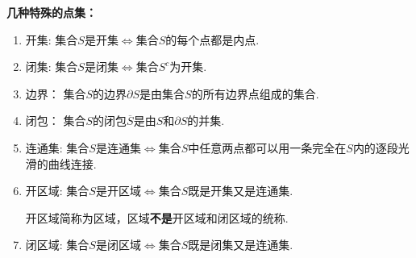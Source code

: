 \documentclass[openany,oneside]{ctexbook}
\begin{document}
\noindent\textbf{几种特殊的点集：}
\begin{enumerate}[label=(\arabic*), itemsep=1pt]
   \item 开集: 集合$S$是开集$\iff$集合$S$的每个点都是内点.
   \item 闭集: 集合$S$是闭集$\iff$集合$S^c$为开集.
   \item 边界： 集合$S$的边界$\partial S$是由集合$S$的所有边界点组成的集合.
   \item 闭包： 集合$S$的闭包$\overline{S}$是由$S$和$\partial S$的并集.
   \item 连通集: 集合$S$是连通集$\iff$集合$S$中任意两点都可以用一条完全在$S$内的逐段光滑的曲线连接.
   
   \item 开区域: 集合$S$是开区域$\iff$集合$S$既是开集又是连通集.
   
    \begin{note*}
        开区域简称为区域，区域\textbf{不是}开区域和闭区域的统称.
    \end{note*} 
    \item 闭区域: 集合$S$是闭区域$\iff$集合$S$既是闭集又是连通集.
\end{enumerate}
\end{document}
